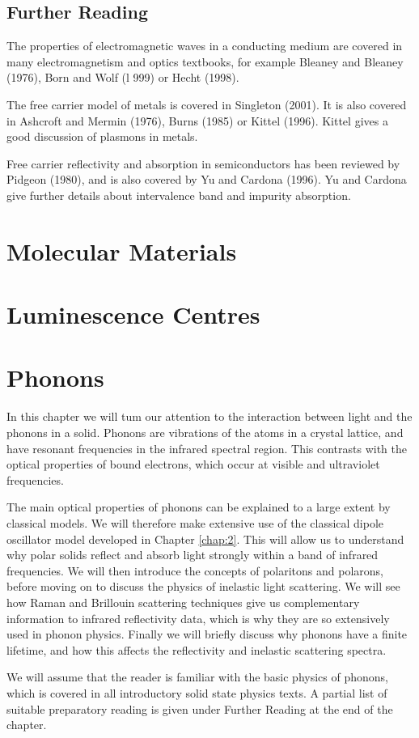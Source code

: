 \documentclass[12pt]{book}
\begin{document}
\section*{Further Reading}
The properties of electromagnetic waves in a conducting medium are covered in many electromagnetism and optics textbooks, for example Bleaney and Bleaney (1976), Born and Wolf (l 999) or Hecht (1998).

The free carrier model of metals is covered in Singleton (2001). It is also covered in Ashcroft and Mermin (1976), Burns (1985) or Kittel (1996). Kittel gives a good discussion of plasmons in metals.

Free carrier reflectivity and absorption in semiconductors has been reviewed by Pidgeon (1980), and is also covered by Yu and Cardona (1996). Yu and Cardona give further details about intervalence band and impurity absorption.
\chapter{Molecular Materials}\label{chap:8}
\chapter{Luminescence Centres}\label{chap:9}
\chapter{Phonons}\label{chap:10}
\begin{shaded}
In this chapter we will tum our attention to the interaction between light and the phonons in a solid. Phonons are vibrations of the atoms in a crystal lattice, and have resonant frequencies in the infrared spectral region. This contrasts with the optical properties of bound electrons, which occur at visible and ultraviolet frequencies.

The main optical properties of phonons can be explained to a large extent by classical models. We will therefore make extensive use of the classical dipole oscillator model developed in Chapter \ref{chap:2}. This will allow us to understand why polar solids reflect and absorb light strongly within a band of infrared frequencies. We will then introduce the concepts of polaritons and polarons, before moving on to discuss the physics of inelastic light scattering. We will see how Raman and Brillouin scattering techniques give us complementary information to infrared reflectivity data, which is why they are so extensively used in phonon physics. Finally we will briefly discuss why phonons have a finite lifetime, and how this affects the reflectivity and inelastic scattering spectra.

We will assume that the reader is familiar with the basic physics of phonons, which is covered in all introductory solid state physics texts. A partial list of suitable preparatory reading is given under Further Reading at the end of the chapter.
\end{shaded}
\end{document}
